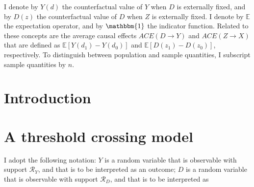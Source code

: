 \documentclass[10pt,a4paper,twoside]{article}
\newcommand{\details}{C:/Dropbox/TeXTemplates/}
\numberwithin{equation}{subsection}
\begin{document}
I denote by $Y(d)$ the counterfactual value of $Y$ when $D$ is externally fixed, and by $D(z)$ the counterfactual value of $D$ when $Z$ is externally fixed. I denote by $\mathbb{E}$ the expectation operator, and  by $\mathbbm{1}$ the indicator function. Related to these concepts are the average causal effects $ACE(D\rightarrow Y)$ and $ACE(Z\rightarrow X)$ that are defined as $\mathbb{E}[Y(d_1)-Y(d_0)]$ and $\mathbb{E}[D(z_1)-D(z_0)]$, respectively. To distinguish between population and sample quantities, I subscript sample quantities by $n$. 
\section{Introduction}
\section{A threshold crossing model}
I adopt the following notation: $Y$ is a random variable that is observable with support $\mathcal{R}_Y$, and that is to be interpreted as an outcome; $D$ is a random variable that is observable with support $\mathcal{R}_D$, and that is to be interpreted as 


\end{document}
